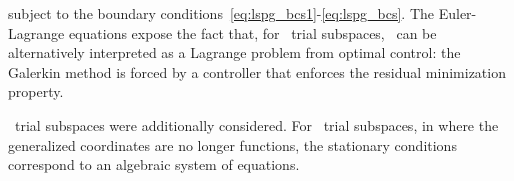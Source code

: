  subject to the boundary conditions~\eqref{eq:lspg_bcs1}-\eqref{eq:lspg_bcs}. The Euler-Lagrange equations expose the fact that, for \spatialAcronym\
trial subspaces, \methodAcronym\ can be alternatively interpreted as a Lagrange problem from optimal control: the Galerkin method is forced by a 
controller that enforces the residual minimization property. 

 \spaceTimeAcronym\ trial subspaces were additionally considered. For \spaceTimeAcronym\ trial subspaces, in where the generalized coordinates are no longer functions, the stationary conditions correspond to an algebraic system of equations.
